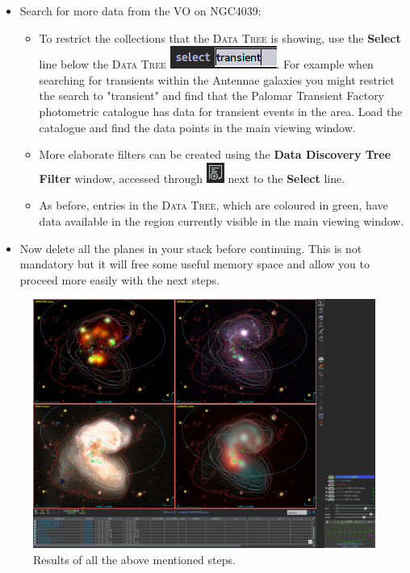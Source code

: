 \documentclass [a4paper, 12pt]{article}
\begin{document}
\begin{itemize}
    \item Search for more data from the VO on NGC4039:
    \begin{itemize}
        \item To restrict the collections that the \textsc{Data Tree} is
        showing, use the \textbf{Select} line below the
        \textsc{Data Tree} \includegraphics[width=0.1
        \textwidth]{../images/aladin_select_transient.png}. For example when
        searching for transients within
        the Antennae galaxies you might restrict the search to "transient" and
        find that the Palomar Transient Factory photometric catalogue has data
        for transient events in the area. Load the catalogue and find the data
        points in the main viewing window.
        \item More elaborate filters can be created using the \textbf{Data
        Discovery Tree Filter} window, accessed through
        \includegraphics[width=0.04
        \textwidth]{../images/aladin_button_filtertree.png} next to the
        \textbf{Select} line.
        \item As before, entries in the \textsc{Data Tree}, which are coloured
        in green, have data available in the region currently visible in the
        main viewing window.
    \end{itemize}
    \item Now delete all the planes in your stack before continuing. This is
    not mandatory but it will free some useful memory space and allow you to
    proceed more easily with the next steps.
\end{itemize}
\begin{figure}[H]
\center
\includegraphics[width=0.7
\textwidth]{../images/aladin_results_cdstutorial-sec4.png}
\caption{Results of all the above mentioned steps.}
\label{fig:aladinNGC4039}
\end{figure}
\end{document}

